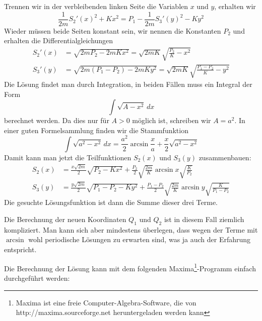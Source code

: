 \begin{loesung}
Trennen wir in der verbleibenden linken Seite die Variablen $x$ und $y$,
erhalten wir
\[
\frac1{2m}S_2'(x)^2+Kx^2
=
P_1-
\frac1{2m}S_3'(y)^2-Ky^2
\]
Wieder müssen beide Seiten konstant sein, wir nennen die Konstanten $P_2$
und erhalten die Differentialgleichungen
\begin{align*}
S_2'(x)&=\sqrt{2mP_2-2mKx^2}=\sqrt{2mK}\sqrt{\frac{P_2}{K}-x^2}\\
S_3'(y)&=\sqrt{2m(P_1-P_2)-2mKy^2}=\sqrt{2mK}\sqrt{\frac{P_1-P_2}{K}-y^2}
\end{align*}
Die Lösung findet man durch Integration, in beiden Fällen muss ein 
Integral der Form
\[
\int \sqrt{A-x^2}\,dx
\]
berechnet werden.
Da dies nur für $A>0$ möglich ist, schreiben wir $A=a^2$.
In einer guten Formelsammlung finden wir die Stammfunktion
\[
\int\sqrt{a^2-x^2}\,dx
=
\frac{a^2}2\arcsin\frac{x}{a}+\frac{x}2\sqrt{a^2-x^2}
\]
Damit kann man jetzt die Teilfunktionen $S_2(x)$ und $S_3(y)$
zusammenbauen:
\begin{align*}
S_2(x)
&=
\frac{x\sqrt{2m}}2\sqrt{P_2-Kx^2}
+
\frac{P_2}{2}\sqrt{\frac{2m}{K}}\arcsin x\sqrt{\frac{K}{P_2}}
\\
S_3(y)
&=
\frac{y\sqrt{2m}}2\sqrt{P_1-P_2-Ky^2}
+
\frac{P_1-P_2}2 \sqrt{\frac{2m}{K}}\arcsin y\sqrt{\frac{K}{P_1-P_2}}
\end{align*}
Die gesuchte Lösungsfunktion ist dann die Summe dieser drei Terme.
\end{loesung}

\begin{diskussion}
Die Berechnung der neuen Koordinaten $Q_1$ und $Q_2$ ist in diesem
Fall ziemlich kompliziert. Man kann sich aber mindestens überlegen,
dass wegen der Terme mit $\arcsin$ wohl periodische Lösungen zu
erwarten sind, was ja auch der Erfahrung entspricht.

Die Berechnung der Lösung kann mit dem folgenden Maxima\footnote{Maxima
ist eine freie Computer-Algebra-Software, die von
http://maxima.sourceforge.net heruntergeladen werden kann}-Programm
einfach durchgeführt werden:
\end{diskussion}
